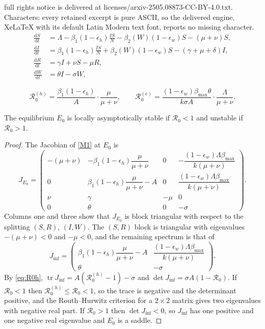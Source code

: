 \documentclass[10pt,a4paper]{amsart}
\newcommand{\Rze}{\mathcal{R}_0^{(e)}}
\newcommand{\Rzh}{\mathcal{R}_0^{(h)}}
\newcommand{\Rz}{\mathcal{R}_0}
\newcommand{\dd}{\mathrm{d}}
\begin{document}
full rights notice is delivered at licenses/arxiv-2505.08873-CC-BY-4.0.txt. Characters: every retained excerpt is pure ASCII, so the delivered engine, XeLaTeX with its default Latin Modern text font, reports no missing character.
\begin{equation}\label{M1}
\begin{aligned}
\frac{\dd S}{\dd t} &= \Lambda - \beta_1(1-\epsilon_h)\frac{IS}{N} - \beta_2(W)(1-\epsilon_w)S - (\mu + \nu)S,\\
\frac{\dd I}{\dd t} &= \beta_1(1-\epsilon_h)\frac{IS}{N} + \beta_2(W)(1-\epsilon_w)S - (\gamma + \mu + \delta)I, \\
\frac{\dd R}{\dd t} &= \gamma I + \nu S - \mu R,\\
\frac{\dd W}{\dd t} &= \theta I - \sigma W,
\end{aligned}
\end{equation}

\begin{equation}\label{eq:R0h}
\Rzh=\frac{\beta_1(1-\epsilon_h)}{A}\cdot\frac{\mu}{\mu+\nu},
\qquad
\Rze=\frac{(1-\epsilon_w)\beta_{\max}\theta}{k\sigma A}\cdot\frac{\Lambda}{\mu+\nu}.
\end{equation}

\begin{theorem}\label{thm:local_DFE}
The equilibrium $E_0$ is locally asymptotically stable if $\Rz<1$ and unstable if $\Rz>1$.
\end{theorem}

\begin{proof}
The Jacobian of \eqref{M1} at $E_0$ is
\[
J_{E_0}=\begin{pmatrix}
-(\mu+\nu) & -\beta_1(1-\epsilon_h)\dfrac{\mu}{\mu+\nu} & 0 & -\dfrac{(1-\epsilon_w)\Lambda\beta_{\max}}{k(\mu+\nu)}\\[8pt]
0 & \beta_1(1-\epsilon_h)\dfrac{\mu}{\mu+\nu}-A & 0 & \dfrac{(1-\epsilon_w)\Lambda\beta_{\max}}{k(\mu+\nu)}\\[8pt]
\nu & \gamma & -\mu & 0\\[4pt]
0 & \theta & 0 & -\sigma
\end{pmatrix}.
\]
Columns one and three show that $J_{E_0}$ is block triangular with respect to the splitting $(S,R)$, $(I,W)$. The $(S,R)$ block is triangular with eigenvalues $-(\mu+\nu)<0$ and $-\mu<0$, and the remaining spectrum is that of
\[
J_{\mathrm{inf}}=\begin{pmatrix}
\beta_1(1-\epsilon_h)\dfrac{\mu}{\mu+\nu}-A & \dfrac{(1-\epsilon_w)\Lambda\beta_{\max}}{k(\mu+\nu)}\\[8pt]
\theta & -\sigma
\end{pmatrix}.
\]
By \eqref{eq:R0h}, $\operatorname{tr}J_{\mathrm{inf}}=A(\Rzh-1)-\sigma$ and $\det J_{\mathrm{inf}}=\sigma A(1-\Rz)$. If $\Rz<1$ then $\Rzh\le\Rz<1$, so the trace is negative and the determinant positive, and the Routh--Hurwitz criterion for a $2\times2$ matrix gives two eigenvalues with negative real part. If $\Rz>1$ then $\det J_{\mathrm{inf}}<0$, so $J_{\mathrm{inf}}$ has one positive and one negative real eigenvalue and $E_0$ is a saddle.
\end{proof}
\end{document}
